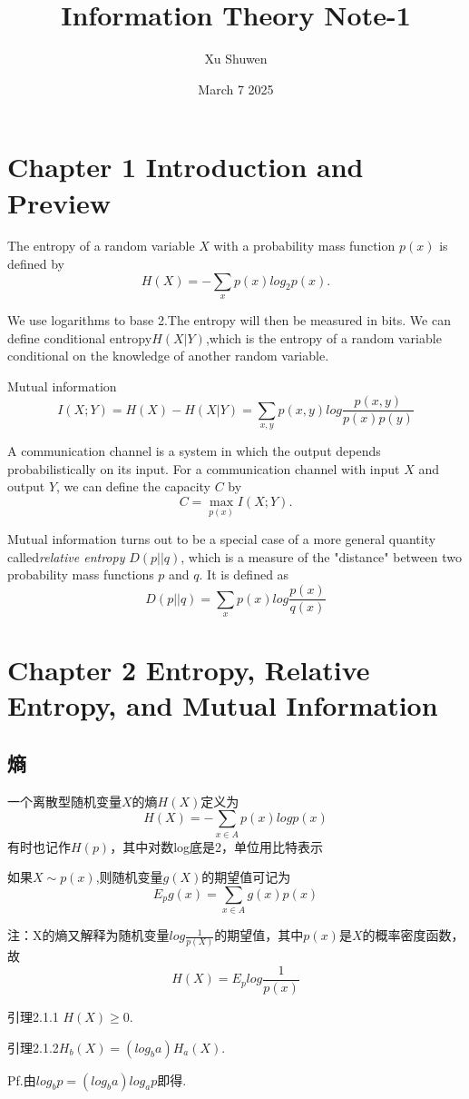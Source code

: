 \documentclass{article}
\title{Information Theory Note-1}
\author{Xu Shuwen}
\date{March 7 2025}
\begin{document}
\maketitle

\section{Chapter 1 Introduction and Preview}

The entropy of a random variable \(X\) with a probability mass function \(p(x)\) is defined by\[H(X)=-\sum_{x}p(x)log_2p(x).\]

We use logarithms to base 2.The entropy will then be measured in bits.
We can define conditional entropy$H(X|Y)$,which is the entropy of a random variable conditional on the knowledge of another random variable.

Mutual information\[I(X;Y)=H(X)-H(X|Y)=\sum_{x,y}p(x,y)log\frac{p(x,y)}{p(x)p(y)}\]

A communication channel is a system in which the output depends probabilistically on its input. For a communication channel with input $X$ and output $Y$, we can define the capacity $C$ by\[C=\max_{p(x)}I(X;Y).\]

Mutual information turns out to be a special case of a more general quantity called\emph{relative entropy} $D(p||q)$, which is a measure of the "distance" between two probability mass functions $p$ and $q$. It is defined as\[D(p||q)=\sum_xp(x)log\frac{p(x)}{q(x)}\]

\section{Chapter 2 Entropy, Relative Entropy, and Mutual Information}
\subsection{熵}

一个离散型随机变量$X$的熵$H(X)$定义为\[H(X)=-\sum_{x\in A}p(x)logp(x)\]有时也记作$H(p)$，其中对数log底是2，单位用比特表示

如果$X\sim p(x)$,则随机变量$g(X)$的期望值可记为\[E_pg(x)=\sum_{x\in A}g(x)p(x)\]

注：X的熵又解释为随机变量$log\frac{1}{p(X)}$的期望值，其中$p(x)$是$X$的概率密度函数，故\[H(X)=E_plog\frac{1}{p(x)}\]

引理2.1.1 $H(X)\geq0$.

引理2.1.2$H_b(X)=(log_ba)H_a(X)$.

Pf.由$log_bp=(log_ba)log_ap$即得.
\end{document}
